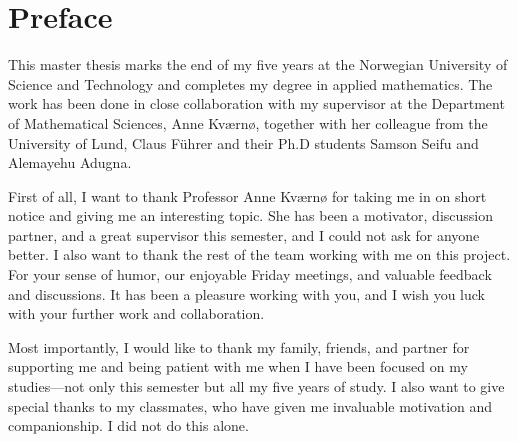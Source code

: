 \chapter*{Preface}
This master thesis marks the end of my five years at the Norwegian University of Science and Technology and completes my degree in applied mathematics. The work has been done in close collaboration with my supervisor at the Department of Mathematical Sciences, Anne Kværnø, together with her colleague from the University of Lund, Claus Führer and their Ph.D students Samson Seifu and Alemayehu Adugna.

First of all, I want to thank Professor Anne Kværnø for taking me in on short notice and giving me an interesting topic. She has been a motivator, discussion partner, and a great supervisor this semester, and I could not ask for anyone better. I also want to thank the rest of the team working with me on this project. For your sense of humor, our enjoyable Friday meetings, and valuable feedback and discussions. It has been a pleasure working with you, and I wish you luck with your further work and collaboration.

Most importantly, I would like to thank my family, friends, and partner for supporting me and being patient with me when I have been focused on my studies---not only this semester but all my five years of study. I also want to give special thanks to my classmates, who have given me invaluable motivation and companionship. I did not do this alone.

